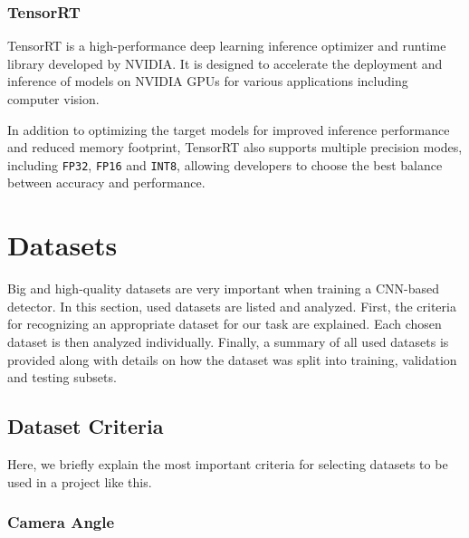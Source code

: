 \subsection{TensorRT}

TensorRT  is a high-performance deep learning inference optimizer and runtime
library developed by NVIDIA. It is designed to accelerate the deployment and
inference of models on NVIDIA GPUs for various applications including computer
vision.

In addition to optimizing the target models for improved inference
performance and reduced memory footprint, TensorRT also supports multiple
precision modes, including \texttt{FP32}, \texttt{FP16} and \texttt{INT8},
allowing developers to choose the best balance between accuracy and performance.










\chapter{Datasets}

Big and high-quality datasets are very important when training a CNN-based
detector. In this section, used datasets are listed and analyzed. First, the
criteria for recognizing an appropriate dataset for our task are explained. Each
chosen dataset is then analyzed individually. Finally, a summary of all used
datasets is provided along with details on how the dataset was split into
training, validation and testing subsets.

\section{Dataset Criteria}

Here, we briefly explain the most important criteria for selecting datasets to
be used in a project like this.

\subsection*{Camera Angle}

